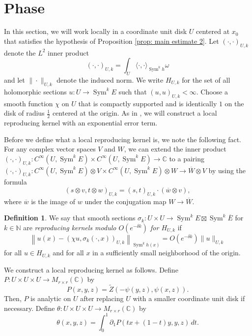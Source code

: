 \documentclass{amsart}
\theoremstyle{definition}
\newtheorem{defn}[thm]{Definition}
\theoremstyle{remark}
\numberwithin{equation}{section}
\DeclareMathOperator{\Sym}{Sym}
\begin{document}
\section{Phase}

In this section, we will work locally in a coordinate unit disk $U$ centered at $x_0$ that satisfies the hypothesis of Proposition \ref{prop: main estimate 2}. Let $(\cdot, \cdot)_{U,k}$ denote the $L^2$ inner product
$$
(\cdot, \cdot)_{U,k} = \int_U \langle \cdot, \cdot \rangle_{\Sym^kh} \omega
$$
and let $\| \cdot \|_{U,k}$ denote the induced norm. We write $H_{U,k}$ for the set of all holomorphic sections $u : U \to \Sym^k E$ such that $(u,u)_{U,k} < \infty$. Choose a smooth function $\chi$ on $U$ that is compactly supported and is identically $1$ on the disk of radius $\frac{1}{2}$ centered at the origin. As in \cite{BBS}, we will construct a local reproducing kernel with an exponential error term.


Before we define what a local reproducing kernel is, we note the following fact. For any complex vector spaces $V$ and $W$, we can extend the inner product $( \cdot, \cdot)_{U,k} : C^\infty(U,\Sym^k E) \times C^\infty(U,\Sym^k E) \to \mathbb{C}$ to a pairing $(\cdot, \cdot)_{U,k} : C^\infty(U,\Sym^k E) \otimes V \times C^\infty(U,\Sym^k E) \otimes W \to \overline{W} \otimes V$ by using the formula
$$
(s \otimes v, t \otimes w)_{U,k} = (s,t)_{U,k} \cdot ( \overline{w} \otimes v),
$$
where $\overline{w}$ is the image of $w$ under the conjugation map $W \to \overline{W}$.
\begin{defn}
We say that smooth sections $\sigma_k : U \times U \to \Sym^k E \boxtimes \Sym^k \overline{E}$ for $k \in \mathbb{N}$ are \emph{reproducing kernels modulo $O(e^{-\delta k})$ for $H_{U,k}$} if 
\begin{equation*}
\left \| u(x) - (\chi u, \sigma_k(\cdot, x))_{U,k} \right \|_{\Sym^k h(x)} = O(e^{-\delta k}) \|u\|_{U,k} 
\end{equation*}
for all $u \in H_{U,k}$ and for all $x$ in a sufficiently small neighborhood of the origin.
\end{defn}


We construct a local reproducing kernel as follows. Define $P : U \times U \times U \to M_{r \times r}(\mathbb{C})$ by
\begin{equation} \label{eq: Phase}
P(x,y,z) = \tilde{Z}(-\psi(y,z), \psi(x,z)).
\end{equation}
Then, $P$ is analytic on $U$ after replacing $U$ with a smaller coordinate unit disk if necessary. Define $\theta : U\times U \times U \to M_{r \times r}(\mathbb{C})$ by
$$
\theta(x,y,z) = \int_0^1 \partial_1 P(tx + (1-t) y, y, z) \,dt. 
$$
\end{document}
